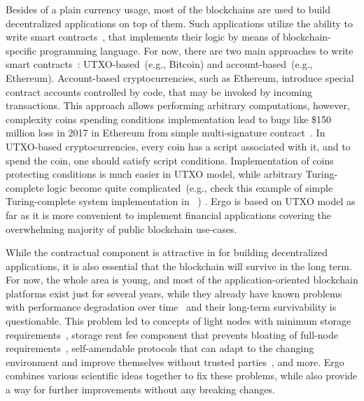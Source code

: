 Besides of a plain currency usage, most of the blockchains are used to build decentralized applications on top of them.
Such applications utilize the ability to write smart contracts~\cite{szabo1994smart}, that implements their logic
by means of blockchain-specific programming language.
For now, there are two main approaches to write smart contracts~\cite{zahnentferner2018chimeric}:
UTXO-based~(e.g., Bitcoin) and account-based~(e.g., Ethereum).
Account-based cryptocurrencies, such as Ethereum, introduce special contract accounts controlled by code,
that may be invoked by incoming transactions.
This approach allows performing arbitrary computations, however, complexity coins spending conditions
implementation  lead to bugs like \$150 million loss in 2017 in
Ethereum from simple multi-signature contract~\cite{parityLock}.
In UTXO-based cryptocurrencies, every coin has a script associated with it, and to spend the coin, one should
satisfy script conditions.
Implementation of coins protecting conditions is much easier in UTXO model,
while arbitrary Turing-complete logic become quite complicated~(e.g., check this example of
simple Turing-complete system implementation in \Ergo{}~\cite{chepurnoy2018self}) .
Ergo is based on UTXO model as far as it is more convenient to implement financial applications covering the
overwhelming majority of public blockchain use-cases.

While the contractual component is attractive in for building decentralized applications,
it is also essential that the blockchain will survive in the long term.
For now, the whole area is young, and most of the application-oriented blockchain platforms exist just for several years,
while they already have known problems with performance degradation over time~\cite{???} and their long-term survivability is questionable.
This problem led to concepts of light nodes with minimum storage requirements~\cite{reyzin2017improving},
storage rent fee component that prevents bloating of full-node requirements~\cite{chepurnoy2018systematic},
self-amendable protocols that can adapt to the changing environment and improve themselves without
trusted parties~\cite{goodman2014tezos}, and more.
Ergo combines various scientific ideas together to fix these problems, while also provide a way for
further improvements without any breaking changes.

